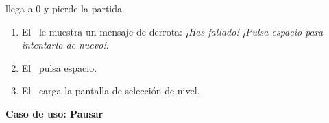 \begin{description}
\begin{description}
            llega a 0 y pierde la partida.
                \begin{enumerate}
                    \item El \sistema\ le muestra un mensaje de derrota:
                    \emph{¡Has fallado! ¡Pulsa espacio para intentarlo
                    de nuevo!}.
                    \item El \jugador\ pulsa espacio.
                    \item El \sistema\ carga la pantalla de selección de nivel.\\
                \end{enumerate}
        \end{description}
    
\end{description}


\textbf{Caso de uso: Pausar}

